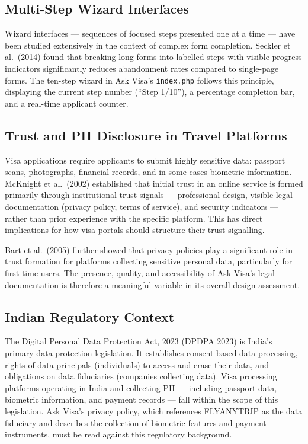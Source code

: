 \documentclass[journal, 10pt, twoside]{IEEEtran}
\begin{document}
\subsection{Multi-Step Wizard Interfaces}
Wizard interfaces --- sequences of focused steps presented one at a time ---
have been studied extensively in the context of complex form completion.
Seckler et al.\ (2014) found that breaking long forms into labelled steps
with visible progress indicators significantly reduces abandonment rates
compared to single-page forms. The ten-step wizard in Ask Visa's
\texttt{index.php} follows this principle, displaying the current step
number (``Step 1/10''), a percentage completion bar, and a real-time
applicant counter.

\subsection{Trust and PII Disclosure in Travel Platforms}
Visa applications require applicants to submit highly sensitive data:
passport scans, photographs, financial records, and in some cases biometric
information. McKnight et al.\ (2002) established that initial trust in an
online service is formed primarily through institutional trust signals ---
professional design, visible legal documentation (privacy policy, terms of
service), and security indicators --- rather than prior experience with
the specific platform. This has direct implications for how visa portals
should structure their trust-signalling.

Bart et al.\ (2005) further showed that privacy policies play a significant
role in trust formation for platforms collecting sensitive personal data,
particularly for first-time users. The presence, quality, and accessibility
of Ask Visa's legal documentation is therefore a meaningful variable in its
overall design assessment.

\subsection{Indian Regulatory Context}
The Digital Personal Data Protection Act, 2023 (DPDPA 2023) is India's
primary data protection legislation. It establishes consent-based data
processing, rights of data principals (individuals) to access and erase
their data, and obligations on data fiduciaries (companies collecting
data). Visa processing platforms operating in India and collecting PII ---
including passport data, biometric information, and payment records ---
fall within the scope of this legislation. Ask Visa's privacy policy, which
references FLYANYTRIP as the data fiduciary and describes the collection of
biometric features and payment instruments, must be read against this
regulatory background.
\end{document}
